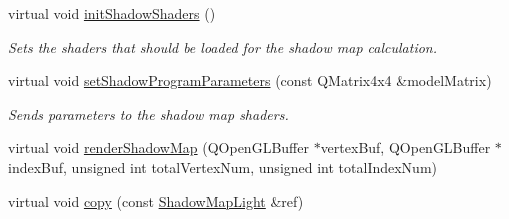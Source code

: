 \begin{DoxyCompactItemize}
virtual void \mbox{\hyperlink{class_geometry_engine_1_1_geometry_world_item_1_1_geometry_light_1_1_shadow_map_light_a5f116fe6be03990ec35b2bfa90d8d6e7}{init\+Shadow\+Shaders}} ()
\begin{DoxyCompactList}\small\item\em Sets the shaders that should be loaded for the shadow map calculation. \end{DoxyCompactList}\item 
\mbox{\label{class_geometry_engine_1_1_geometry_world_item_1_1_geometry_light_1_1_shadow_map_light_abcc80135c350beeae54a684cf4b61d1e}} 
virtual void \mbox{\hyperlink{class_geometry_engine_1_1_geometry_world_item_1_1_geometry_light_1_1_shadow_map_light_abcc80135c350beeae54a684cf4b61d1e}{set\+Shadow\+Program\+Parameters}} (const Q\+Matrix4x4 \&model\+Matrix)
\begin{DoxyCompactList}\small\item\em Sends parameters to the shadow map shaders. \end{DoxyCompactList}\item 
virtual void \mbox{\hyperlink{class_geometry_engine_1_1_geometry_world_item_1_1_geometry_light_1_1_shadow_map_light_a607026e6ab01948eef922a9370ee35f7}{render\+Shadow\+Map}} (Q\+Open\+G\+L\+Buffer $\ast$vertex\+Buf, Q\+Open\+G\+L\+Buffer $\ast$index\+Buf, unsigned int total\+Vertex\+Num, unsigned int total\+Index\+Num)
\item 
virtual void \mbox{\hyperlink{class_geometry_engine_1_1_geometry_world_item_1_1_geometry_light_1_1_shadow_map_light_a778fdb3b00c8b930e03ebbde77c9433c}{copy}} (const \mbox{\hyperlink{class_geometry_engine_1_1_geometry_world_item_1_1_geometry_light_1_1_shadow_map_light}{Shadow\+Map\+Light}} \&ref)
\end{DoxyCompactItemize}
